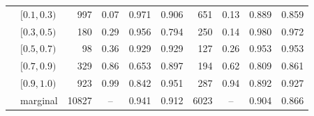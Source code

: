 \begin{table}[H]
\begin{tabular}{llrcccrccc}
 & $[0.1,0.3)$ & 997 & 0.07 & 0.971 & 0.906 & 651 & 0.13 & 0.889 & 0.859 \\
 & $[0.3,0.5)$ & 180 & 0.29 & 0.956 & 0.794 & 250 & 0.14 & 0.980 & 0.972 \\
 & $[0.5,0.7)$ & 98 & 0.36 & 0.929 & 0.929 & 127 & 0.26 & 0.953 & 0.953 \\
 & $[0.7,0.9)$ & 329 & 0.86 & 0.653 & 0.897 & 194 & 0.62 & 0.809 & 0.861 \\
 & $[0.9,1.0)$ & 923 & 0.99 & 0.842 & 0.951 & 287 & 0.94 & 0.892 & 0.927 \\
 & marginal & 10827 & -- & 0.941 & 0.912 & 6023 & -- & 0.904 & 0.866 \\
\bottomrule
\end{tabular}
\end{table}

